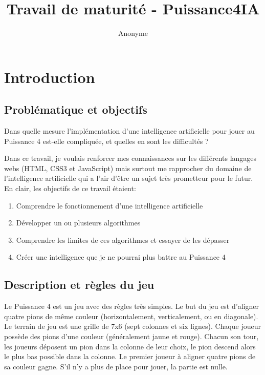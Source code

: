 \documentclass[a4paper]{article}
\author{Anonyme}
\title{Travail de maturité - Puissance4IA}
\begin{document}
\maketitle

\tableofcontents

\newpage
\section{Introduction}

\subsection{Problématique et objectifs}
    Dans quelle mesure l'implémentation d'une intelligence artificielle pour jouer au Puissance 4 est-elle compliquée, et quelles en sont les difficultés ?

    Dans ce travail, je voulais renforcer mes connaissances sur les différents langages webs (HTML, CSS3 et JavaScript) mais surtout me rapprocher du domaine de l'intelligence artificielle qui a l'air d'être un sujet très prometteur pour le futur. En clair, les objectifs de ce travail étaient:
    \begin{enumerate}
        \item Comprendre le fonctionnement d'une intelligence artificielle
        \item Développer un ou plusieurs algorithmes
        \item Comprendre les limites de ces algorithmes et essayer de les dépasser
        \item Créer une intelligence que je ne pourrai plus battre au Puissance 4
    \end{enumerate}

\subsection{Description et règles du jeu}
    Le Puissance 4 est un jeu avec des règles très simples. Le but du jeu est d'aligner quatre pions de même couleur (horizontalement, verticalement, ou en diagonale). Le terrain de jeu est une grille de 7x6 (sept colonnes et six lignes). Chaque joueur possède des pions d'une couleur (généralement jaune et rouge). Chacun son tour, les joueurs déposent un pion dans la colonne de leur choix, le pion descend alors le plus bas possible dans la colonne. Le premier joueur à aligner quatre pions de sa couleur gagne. S'il n'y a plus de place pour jouer, la partie est nulle.
\end{document}
